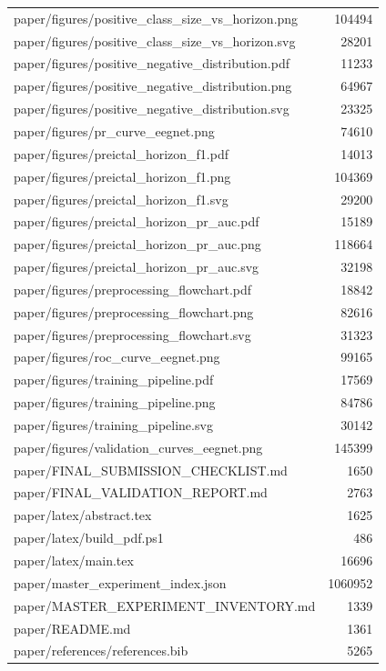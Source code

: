\begin{tabular}{lr}
paper/figures/positive\_class\_size\_vs\_horizon.png & 104494 \\
paper/figures/positive\_class\_size\_vs\_horizon.svg & 28201 \\
paper/figures/positive\_negative\_distribution.pdf & 11233 \\
paper/figures/positive\_negative\_distribution.png & 64967 \\
paper/figures/positive\_negative\_distribution.svg & 23325 \\
paper/figures/pr\_curve\_eegnet.png & 74610 \\
paper/figures/preictal\_horizon\_f1.pdf & 14013 \\
paper/figures/preictal\_horizon\_f1.png & 104369 \\
paper/figures/preictal\_horizon\_f1.svg & 29200 \\
paper/figures/preictal\_horizon\_pr\_auc.pdf & 15189 \\
paper/figures/preictal\_horizon\_pr\_auc.png & 118664 \\
paper/figures/preictal\_horizon\_pr\_auc.svg & 32198 \\
paper/figures/preprocessing\_flowchart.pdf & 18842 \\
paper/figures/preprocessing\_flowchart.png & 82616 \\
paper/figures/preprocessing\_flowchart.svg & 31323 \\
paper/figures/roc\_curve\_eegnet.png & 99165 \\
paper/figures/training\_pipeline.pdf & 17569 \\
paper/figures/training\_pipeline.png & 84786 \\
paper/figures/training\_pipeline.svg & 30142 \\
paper/figures/validation\_curves\_eegnet.png & 145399 \\
paper/FINAL\_SUBMISSION\_CHECKLIST.md & 1650 \\
paper/FINAL\_VALIDATION\_REPORT.md & 2763 \\
paper/latex/abstract.tex & 1625 \\
paper/latex/build\_pdf.ps1 & 486 \\
paper/latex/main.tex & 16696 \\
paper/master\_experiment\_index.json & 1060952 \\
paper/MASTER\_EXPERIMENT\_INVENTORY.md & 1339 \\
paper/README.md & 1361 \\
paper/references/references.bib & 5265 \\

\end{tabular}
